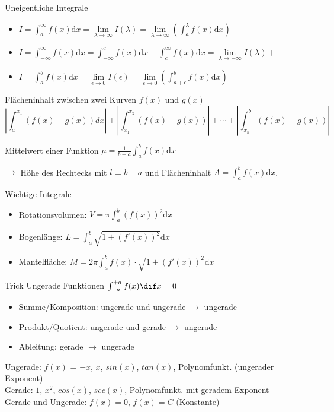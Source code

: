 \begin{concept}{Uneigentliche Integrale}
\begin{itemize}
    \item $I=\int_a^{\infty}{f(x)\mathrm{d}x}=\underset{\lambda \rightarrow \infty}{\lim}I(\lambda)=
		\underset{\lambda \rightarrow \infty}{\lim}(\int_a^{\lambda}{f(x)\mathrm{d}x})$
    \item $I=\int_{-\infty}^{\infty}{f(x)\mathrm{d}x}=\int_{-\infty}^{c}{f(x)\mathrm{d}x}+\int_c^{\infty}
		{f(x)\mathrm{d}x} = \underset{\lambda \rightarrow -\infty}{\lim}I(\lambda)+$
    \item $I=\int_a^b{f(x)\mathrm{d}x}=\underset{\epsilon \rightarrow 0}{\lim}I(\epsilon)=\underset{\epsilon \rightarrow
	0}{\lim}(\int_{a+\epsilon}^b{f(x)\mathrm{d}x})$
\end{itemize}
\end{concept}

\begin{KR}{Flächeninhalt zwischen zwei Kurven $f(x)$ und $g(x)$}
		$$\left|\int_{a}^{x_{1}}(f(x)-g(x)) d x\right|+\left|\int_{x_{1}}^{x_{2}}(f(x)-g(x))\right|+\cdots+\left|\int_{x_{n}}^{b}(f(x)-g(x))\right|$$
\end{KR}


\begin{theorem}{Mittelwert einer Funktion}
    $\mu = \frac{1}{b-a}\int_a^b{f(x)\mathrm{d}x}$

    \small
    $\rightarrow$ Höhe des Rechtecks mit $l$ = $b-a$ und Flächeninhalt $A = \int_a^b{f(x)\mathrm{d}x}$.
\end{theorem}

\begin{corollary}{Wichtige Integrale}
    \begin{itemize}
        \item Rotationsvolumen: $V = \pi \int_a^b{(f(x))^2\mathrm{d}x} $
        \item Bogenlänge: $L = \int_a^b{\sqrt{1+(f'(x))^2}\mathrm{d}x} $
        \item Mantelfläche: $M = 2\pi \int_a^b{f(x)\cdot \sqrt{1+(f'(x))^2}\mathrm{d}x}$
    \end{itemize}
\end{corollary}

\begin{KR}{Trick Ungerade Funktionen}
    $\int_{-a}^{+a} f(x) \dif x = 0$
    \begin{itemize}
        \item Summe/Komposition: ungerade und ungerade $\rightarrow$ ungerade
        \item Produkt/Quotient: ungerade und gerade $\rightarrow$ ungerade
        \item Ableitung: gerade $\longrightarrow$ ungerade
    \end{itemize}
    Ungerade: $f(x)$ = $-x$, $x$, $sin(x)$, $tan(x)$, Polynomfunkt. (ungerader Exponent)\\
    Gerade: $1$, $x^2$, $cos(x)$, $sec(x)$, Polynomfunkt. mit geradem Exponent\\
    Gerade und Ungerade: $f(x) = 0$, $f(x) = C$ (Konstante)
\end{KR}



